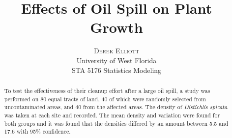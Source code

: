 \documentclass[twoside]{article}
\title{\vspace{-15mm}\fontsize{24pt}{10pt}\selectfont\textbf{Effects of Oil Spill on Plant Growth}} %
\author{
\large
\textsc{Derek Elliott}\\[2mm] %
\normalsize University of West Florida \\ %
\normalsize STA 5176 Statistics Modeling
\date{}
\vspace{-5mm}
}
\begin{document}
\maketitle %

\thispagestyle{fancy} %


\begin{abstract}
 
\noindent To test the effectiveness of their cleanup effort after a large oil spill, a study was performed on 80 equal tracts of land, 40 of which were randomly selected from uncontaminated areas, and 40 from the affected areas. The density of \textit{Distichlis spicata} was taken at each site and recorded.  The mean density and variation were found for both groups and it was found that the densities differed by an amount between 5.5 and 17.6 with 95\% confidence.

\end{abstract}

\end{document}
